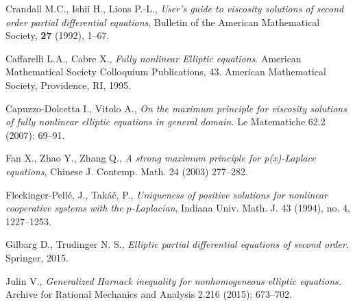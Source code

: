 \documentclass[12pt]{article}
\numberwithin{komcounter}{section}
\begin{document}
\begin{thebibliography}{A}



Crandall M.C., Ishii H., Lions P.-L.,
\emph{User's guide to viscosity solutions of second order partial differential equations}, Bulletin of the American Mathematical Society,
\textbf{27} (1992), 1--67.



Caffarelli L.A., Cabre X.,
\emph{Fully nonlinear Elliptic equations}.
American Mathematical Society Colloquium Publications, 43.
American Mathematical Society, Providence, RI, 1995.

Capuzzo-Dolcetta I., Vitolo A.,
\emph{On the maximum principle for viscosity solutions of fully nonlinear elliptic equations in general domain.}
Le Matematiche 62.2 (2007): 69--91.


Fan X., Zhao Y., Zhang Q.,
\emph{A strong maximum principle for p(x)-Laplace equations},
Chinese J. Contemp. Math. 24 (2003) 277--282.

Fleckinger-Pell\'e, J., Tak\'a\v c, P.,
\emph{Uniqueness of positive solutions for nonlinear cooperative systems with the {$p$}-{L}aplacian}, Indiana Univ. Math. J. 43 (1994), no. 4, 1227--1253.

Gilbarg D., Trudinger N. S.,
\emph{Elliptic partial differential equations of second order}.
Springer, 2015.

Julin V.,
\emph{Generalized Harnack inequality for nonhomogeneous elliptic equations.}
Archive for Rational Mechanics and Analysis 2.216 (2015): 673--702.


\end{thebibliography}
\end{document}
